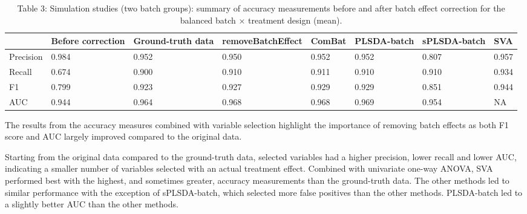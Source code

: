 \documentclass[
]{book}
\begin{document}
\begin{table}

\caption{\label{tab:unnamed-chunk-114}Table 3: Simulation studies (two batch groups): summary of accuracy measurements before and after batch effect correction for the balanced batch × treatment design (mean).}
\centering
\begin{tabular}[t]{l|l|l|l|l|l|l|l}
\hline
  & Before correction & Ground-truth data & removeBatchEffect & ComBat & PLSDA-batch & sPLSDA-batch & SVA\\
\hline
Precision & 0.984 & 0.952 & 0.950 & 0.952 & 0.952 & 0.807 & 0.957\\
\hline
Recall & 0.674 & 0.900 & 0.910 & 0.911 & 0.910 & 0.910 & 0.934\\
\hline
F1 & 0.799 & 0.923 & 0.927 & 0.929 & 0.929 & 0.851 & 0.944\\
\hline
AUC & 0.944 & 0.964 & 0.968 & 0.968 & 0.969 & 0.954 & NA\\
\hline
\end{tabular}
\end{table}

The results from the accuracy measures combined with variable selection highlight the importance of removing batch effects as both F1 score and AUC largely improved compared to the original data.

Starting from the original data compared to the ground-truth data, selected variables had a higher precision, lower recall and lower AUC, indicating a smaller number of variables selected with an actual treatment effect. Combined with univariate one-way ANOVA, SVA performed best with the highest, and sometimes greater, accuracy measurements than the ground-truth data. The other methods led to similar performance with the exception of sPLSDA-batch, which selected more false positives than the other methods. PLSDA-batch led to a slightly better AUC than the other methods.
\end{document}
